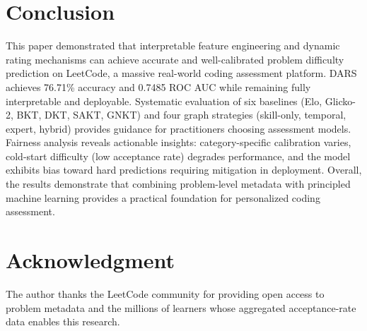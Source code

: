 \documentclass[conference]{IEEEtran}
\begin{document}
\section{Conclusion}
This paper demonstrated that interpretable feature engineering and dynamic rating mechanisms can achieve accurate and well-calibrated problem difficulty prediction on LeetCode, a massive real-world coding assessment platform. DARS achieves 76.71\% accuracy and 0.7485 ROC AUC while remaining fully interpretable and deployable. Systematic evaluation of six baselines (Elo, Glicko-2, BKT, DKT, SAKT, GNKT) and four graph strategies (skill-only, temporal, expert, hybrid) provides guidance for practitioners choosing assessment models. Fairness analysis reveals actionable insights: category-specific calibration varies, cold-start difficulty (low acceptance rate) degrades performance, and the model exhibits bias toward hard predictions requiring mitigation in deployment. Overall, the results demonstrate that combining problem-level metadata with principled machine learning provides a practical foundation for personalized coding assessment.

\section*{Acknowledgment}
The author thanks the LeetCode community for providing open access to problem metadata and the millions of learners whose aggregated acceptance-rate data enables this research.
\end{document}
